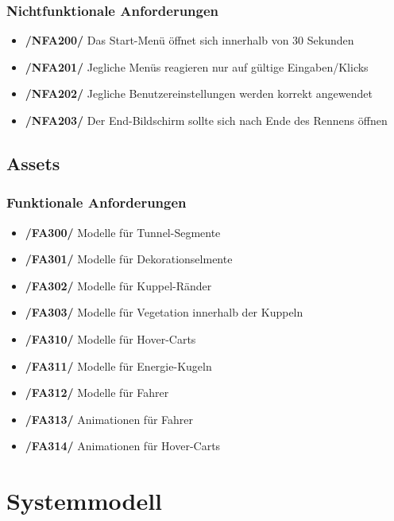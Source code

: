 \documentclass[parskip=full]{scrartcl}
\begin{document}
	\subsubsection{Nichtfunktionale Anforderungen}
	\begin{itemize} [label={}]
		\item \textbf{/NFA200/} Das Start-Menü öffnet sich innerhalb von 30 Sekunden
		\item \textbf{/NFA201/} Jegliche Menüs reagieren nur auf gültige Eingaben/Klicks
		\item \textbf{/NFA202/} Jegliche Benutzereinstellungen werden korrekt angewendet
		\item \textbf{/NFA203/} Der End-Bildschirm sollte sich nach Ende des Rennens öffnen
	\end{itemize}

	\pagebreak
		
	\subsection{Assets}
	\subsubsection{Funktionale Anforderungen}
	\begin{itemize} [label={}]
		\item \textbf{/FA300/} Modelle für Tunnel-Segmente
		\item \textbf{/FA301/} Modelle für Dekorationselmente
		\item \textbf{/FA302/} Modelle für Kuppel-Ränder
		\item \textbf{/FA303/} Modelle für Vegetation innerhalb der Kuppeln
		\item \textbf{/FA310/} Modelle für Hover-Carts
		\item \textbf{/FA311/} Modelle für Energie-Kugeln
		\item \textbf{/FA312/} Modelle für Fahrer
		\item \textbf{/FA313/} Animationen für Fahrer
		\item \textbf{/FA314/} Animationen für Hover-Carts
	\end{itemize}
	
	\pagebreak
	
	\section{Systemmodell}
	
\end{document}
